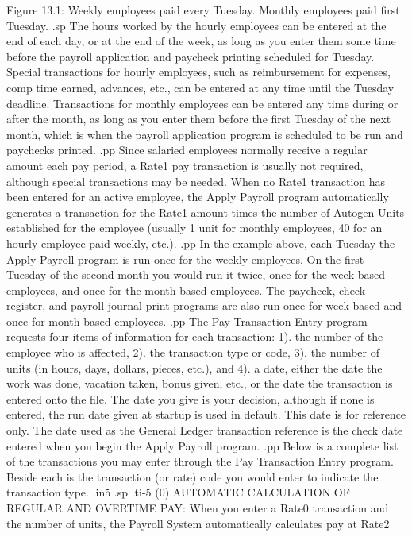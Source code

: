 	Figure 13.1: Weekly employees paid every Tuesday.
		     Monthly employees paid first Tuesday.
.sp
The hours worked by the hourly employees can be entered at the end of each
day, or at the end of the week,
as long as you enter them some time before the payroll
application and paycheck printing scheduled for Tuesday.  Special
transactions for hourly employees, such as
reimbursement for expenses, comp time earned,
advances, etc., can be entered at any time until the Tuesday
deadline.  Transactions for monthly employees can be entered any time
during or after the month, as long as you  enter them before the
first Tuesday of the next month, which is when the payroll application
program is scheduled to be run and paychecks printed.
.pp
Since salaried
employees normally receive a regular amount each pay period, a Rate1
pay transaction is usually not required, although special transactions
may be needed.	When no Rate1 transaction has been entered for an
active employee, the Apply Payroll program automatically generates
a transaction for the Rate1 amount times the number of Autogen
Units established for the employee
(usually 1 unit for monthly employees, 40 for an hourly employee paid
weekly, etc.).
.pp
In the example above, each
Tuesday the Apply Payroll program is run once for the weekly employees.
On the first Tuesday of the second month you would
run it twice, once for the week-based
employees, and once for the month-based employees.  The paycheck,
check register, and payroll journal print programs are also run
once for week-based and once for month-based employees.
.pp
The Pay Transaction Entry program requests four items of information
for each transaction: 1). the number of the employee who
is affected, 2). the transaction type or
code, 3).
the number of units (in hours, days, dollars, pieces, etc.), and 4).
a date, either the date the work was
done, vacation taken, bonus given, etc., or the date the transaction is
entered onto the file.	The date you give is your decision, although
if none is entered, the run date given at startup is used in default.
This date is for reference only.  The date used as the General Ledger
transaction reference is the check date entered when you begin the
Apply Payroll program.
.pp
Below is a complete list of the transactions you may enter through
the Pay Transaction Entry program.  Beside each is the transaction (or
rate) code you would enter to indicate the transaction type.
.in5
.sp
.ti-5
(0)  AUTOMATIC CALCULATION OF REGULAR AND OVERTIME PAY:  When you  enter
a Rate0 transaction and the number of units,
the Payroll System automatically calculates pay at Rate2
